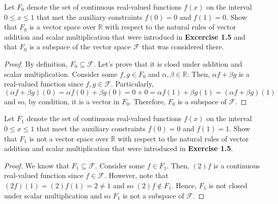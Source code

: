\documentclass[12pt]{article}
\newcommand{\R}{\mathbb{R}}
\newenvironment{problem}[2][Problem]{\begin{trivlist} \item[\hskip \labelsep {\bfseries #1}\hskip \labelsep {\bfseries #2.}]}{\end{trivlist}}
\begin{document}
    \begin{problem}{1.6}
      Let $F_{0}$ denote the set of continuous real-valued functions $f(x)$ on the interval $0\leq x \leq 1$ that met the auxiliary constraints $f(0) =0$ and $f(1) = 0$. Show that $F_{0}$ is a vector space over $\R$ with respect to the natural rules of vector addition and scalar multiplication that were introducd in \textbf{Excercise 1.5} and that $F_{0}$ is a subspace of the vector space $\mathcal{F}$ that was considered there.
    \end{problem}
    \begin{proof}
      By definition, $F_{0} \subseteq \mathcal{F}$. Let's prove that it is closd under addition and scalar multiplication. Consider some $f, g\in F_{0}$ and $\alpha,\beta\in \R$. Then, $\alpha f + \beta g$ is a real-valued function since $f,g\in \mathcal{F}$. Particularly, $(\alpha f + \beta g)(0) = \alpha f(0) + \beta g(0) = 0 + 0 = \alpha f(1) + \beta g(1) = (\alpha f+ \beta g)(1)$ and so, by condition, it is a vector in $F_{0}$. Therefore, $F_{0}$ is a subspace of $\mathcal{F}$. 
    \end{proof}
    \begin{problem}{1.7}
      Let $F_{1}$ denote the set of continuous real-valued functions $f(x)$ on the interval $0\leq x \leq 1$ that meet the auxiliary constraints $f(0)=0$ and $f(1)=1$. Show that $F_{1}$ is not a vector space over $\R$ with respect to the natural rules of vector addition and scalar multiplication that were introduced in \textbf{Exercise 1.5}.
    \end{problem}
    \begin{proof}
      We know that $F_{1}\subseteq \mathcal{F}$. Consider some $f\in F_{1}$. Then, $(2)f$ is a continuous real-valued function since $f\in \mathcal{F}$. However, note that $(2f)(1) = (2)f(1) = 2 \neq 1$ and so $(2)f\not\in F_{1}$. Hence, $F_{1}$ is not closed under scalar multiplication and so $F_{1}$ is not a subspace of $\mathcal{F}$. 
    \end{proof}
\end{document}
